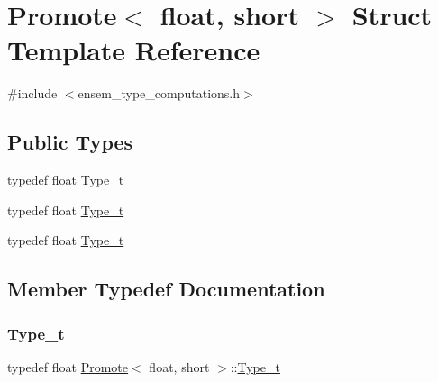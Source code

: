 \hypertarget{structPromote_3_01float_00_01short_01_4}{}\section{Promote$<$ float, short $>$ Struct Template Reference}
\label{structPromote_3_01float_00_01short_01_4}


{\ttfamily \#include $<$ensem\+\_\+type\+\_\+computations.\+h$>$}

\subsection*{Public Types}
\begin{DoxyCompactItemize}
\item 
typedef float \mbox{\hyperlink{structPromote_3_01float_00_01short_01_4_a9c8232afdf3f68f947e67d59a16fd670}{Type\+\_\+t}}
\item 
typedef float \mbox{\hyperlink{structPromote_3_01float_00_01short_01_4_a9c8232afdf3f68f947e67d59a16fd670}{Type\+\_\+t}}
\item 
typedef float \mbox{\hyperlink{structPromote_3_01float_00_01short_01_4_a9c8232afdf3f68f947e67d59a16fd670}{Type\+\_\+t}}
\end{DoxyCompactItemize}


\subsection{Member Typedef Documentation}
\mbox{\label{structPromote_3_01float_00_01short_01_4_a9c8232afdf3f68f947e67d59a16fd670}} 
\subsubsection{\texorpdfstring{Type\_t}{Type\_t}\hspace{0.1cm}{\footnotesize\ttfamily [1/3]}}
{\footnotesize\ttfamily typedef float \mbox{\hyperlink{structPromote}{Promote}}$<$ float, short $>$\+::\mbox{\hyperlink{structPromote_3_01float_00_01short_01_4_a9c8232afdf3f68f947e67d59a16fd670}{Type\+\_\+t}}}

\mbox{\label{structPromote_3_01float_00_01short_01_4_a9c8232afdf3f68f947e67d59a16fd670}} 
